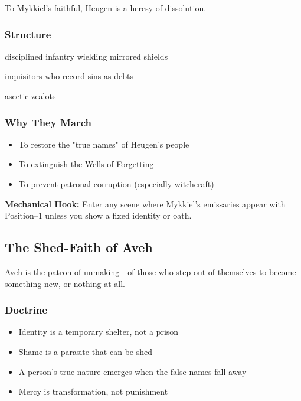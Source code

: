 \documentclass[11pt]{book}
\begin{document}
To Mykkiel's faithful, Heugen is a heresy of dissolution.

\subsubsection*{Structure}
\begin{description}[leftmargin=1.8cm]
    \item[The Lantern Host:] disciplined infantry wielding mirrored shields  
    \item[The Order of the Ledger:] inquisitors who record sins as debts  
    \item[The Bright-Mantled:] ascetic zealots  
\end{description}

\subsubsection*{Why They March}
\begin{itemize}[leftmargin=*]
    \item To restore the "true names" of Heugen's people  
    \item To extinguish the Wells of Forgetting  
    \item To prevent patronal corruption (especially witchcraft)  
\end{itemize}

\textbf{Mechanical Hook:}  
Enter any scene where Mykkiel's emissaries appear with Position--1 unless you show a fixed identity or oath.

\subsection{The Shed-Faith of Aveh}

Aveh is the patron of unmaking---of those who step out of themselves to become something new,  
or nothing at all.

\subsubsection*{Doctrine}
\begin{itemize}[leftmargin=*]
    \item Identity is a temporary shelter, not a prison  
    \item Shame is a parasite that can be shed  
    \item A person's true nature emerges when the false names fall away  
    \item Mercy is transformation, not punishment  
\end{itemize}
\end{document}
